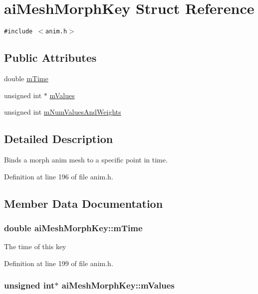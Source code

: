 \hypertarget{structai_mesh_morph_key}{
\section{aiMeshMorphKey Struct Reference}
\label{structai_mesh_morph_key}
}
{\tt \#include $<$anim.h$>$}

\subsection*{Public Attributes}
\begin{CompactItemize}
\item 
double \hyperlink{structai_mesh_morph_key_1429195df415bf1288002b45bba30994}{mTime}
\item 
unsigned int $\ast$ \hyperlink{structai_mesh_morph_key_33bdd586aca85e5bb27162203f780dc3}{mValues}
\item 
unsigned int \hyperlink{structai_mesh_morph_key_28190ef15ed3535c9ae8dc1c8738a6ed}{mNumValuesAndWeights}
\end{CompactItemize}


\subsection{Detailed Description}
Binds a morph anim mesh to a specific point in time. 

Definition at line 196 of file anim.h.

\subsection{Member Data Documentation}
\hypertarget{structai_mesh_morph_key_1429195df415bf1288002b45bba30994}{
\subsubsection[mTime]{\setlength{\rightskip}{0pt plus 5cm}double {\bf aiMeshMorphKey::mTime}}}
\label{structai_mesh_morph_key_1429195df415bf1288002b45bba30994}


The time of this key 

Definition at line 199 of file anim.h.\hypertarget{structai_mesh_morph_key_33bdd586aca85e5bb27162203f780dc3}{
\subsubsection[mValues]{\setlength{\rightskip}{0pt plus 5cm}unsigned int$\ast$ {\bf aiMeshMorphKey::mValues}}}
\label{structai_mesh_morph_key_33bdd586aca85e5bb27162203f780dc3}


